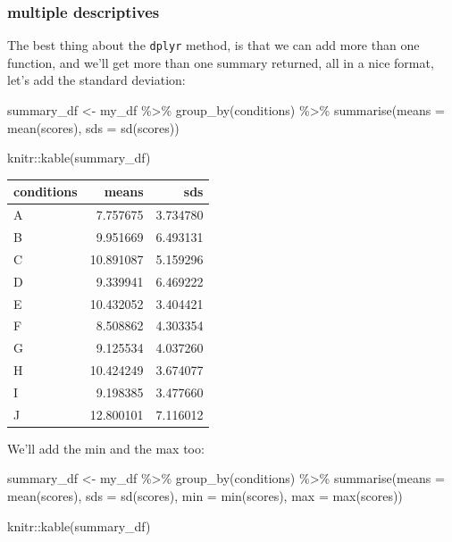 \documentclass[
]{book}
\newenvironment{Shaded}{\begin{snugshade}}{\end{snugshade}}
\newcommand{\AttributeTok}[1]{\textcolor[rgb]{0.77,0.63,0.00}{#1}}
\newcommand{\FunctionTok}[1]{\textcolor[rgb]{0.00,0.00,0.00}{#1}}
\newcommand{\NormalTok}[1]{#1}
\newcommand{\OtherTok}[1]{\textcolor[rgb]{0.56,0.35,0.01}{#1}}
\newcommand{\SpecialCharTok}[1]{\textcolor[rgb]{0.00,0.00,0.00}{#1}}
\begin{document}
\hypertarget{multiple-descriptives}{%
\subsubsection{multiple descriptives}\label{multiple-descriptives}}

The best thing about the \texttt{dplyr} method, is that we can add more than one function, and we'll get more than one summary returned, all in a nice format, let's add the standard deviation:

\begin{Shaded}
\begin{Highlighting}[]
\NormalTok{summary\_df }\OtherTok{\textless{}{-}}\NormalTok{ my\_df }\SpecialCharTok{\%\textgreater{}\%}
               \FunctionTok{group\_by}\NormalTok{(conditions) }\SpecialCharTok{\%\textgreater{}\%}
               \FunctionTok{summarise}\NormalTok{(}\AttributeTok{means =} \FunctionTok{mean}\NormalTok{(scores),}
                         \AttributeTok{sds =} \FunctionTok{sd}\NormalTok{(scores))}

\NormalTok{knitr}\SpecialCharTok{::}\FunctionTok{kable}\NormalTok{(summary\_df)}
\end{Highlighting}
\end{Shaded}

\begin{tabular}{l|r|r}
\hline
conditions & means & sds\\
\hline
A & 7.757675 & 3.734780\\
\hline
B & 9.951669 & 6.493131\\
\hline
C & 10.891087 & 5.159296\\
\hline
D & 9.339941 & 6.469222\\
\hline
E & 10.432052 & 3.404421\\
\hline
F & 8.508862 & 4.303354\\
\hline
G & 9.125534 & 4.037260\\
\hline
H & 10.424249 & 3.674077\\
\hline
I & 9.198385 & 3.477660\\
\hline
J & 12.800101 & 7.116012\\
\hline
\end{tabular}

We'll add the min and the max too:

\begin{Shaded}
\begin{Highlighting}[]
\NormalTok{summary\_df }\OtherTok{\textless{}{-}}\NormalTok{ my\_df }\SpecialCharTok{\%\textgreater{}\%}
               \FunctionTok{group\_by}\NormalTok{(conditions) }\SpecialCharTok{\%\textgreater{}\%}
               \FunctionTok{summarise}\NormalTok{(}\AttributeTok{means =} \FunctionTok{mean}\NormalTok{(scores),}
                         \AttributeTok{sds =} \FunctionTok{sd}\NormalTok{(scores),}
                         \AttributeTok{min =} \FunctionTok{min}\NormalTok{(scores),}
                         \AttributeTok{max =} \FunctionTok{max}\NormalTok{(scores))}

\NormalTok{knitr}\SpecialCharTok{::}\FunctionTok{kable}\NormalTok{(summary\_df)}
\end{Highlighting}
\end{Shaded}
\end{document}

